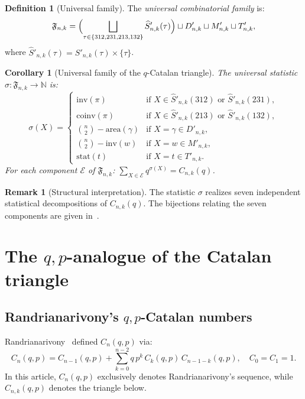 \documentclass[12pt,a4paper,reqno]{amsart}
\theoremstyle{plain}
\newtheorem{corollary}[theorem]{Corollary}
\theoremstyle{definition}
\newtheorem{definition}[theorem]{Definition}
\newtheorem{remark}[theorem]{Remark}
\newcommand{\Inv}{\mathrm{inv}}
\newcommand{\Coinv}{\mathrm{coinv}}
\newcommand{\Area}{\mathrm{area}}
\newcommand{\Snkp}[1]{S'_{n,k}(#1)}
\newcommand{\hSnkp}[1]{\widehat{S}'_{n,k}(#1)}
\newcommand{\Dnk}{D'_{n,k}}
\newcommand{\Mnk}{M'_{n,k}}
\newcommand{\NN}{\mathbb{N}}
\begin{document}
\begin{definition}[Universal family]\label{def:univ_family}
The \emph{universal combinatorial family} is:
\begin{equation}\label{eq:univ_family}
\mathfrak{F}_{n,k} = \Bigl(\bigsqcup_{\tau\in\{312,231,213,132\}}
\hSnkp{\tau}\Bigr)\sqcup\Dnk\sqcup\Mnk\sqcup T'_{n,k},
\end{equation}
where $\hSnkp{\tau}=\Snkp{\tau}\times\{\tau\}$.
\end{definition}

\begin{corollary}[Universal family of the $q$-Catalan triangle]\label{cor:equi}
The \emph{universal statistic} $\sigma:\mathfrak{F}_{n,k}\to\NN$ is:
\begin{equation}\label{eq:sigma}
\sigma(X)=\begin{cases}
\Inv(\pi) & \text{if }X\in\hSnkp{312}\text{ or }\hSnkp{231},\\
\Coinv(\pi) & \text{if }X\in\hSnkp{213}\text{ or }\hSnkp{132},\\
\binom{n}{2}-\Area(\gamma) & \text{if }X=\gamma\in\Dnk,\\
\binom{n}{2}-\Inv(w) & \text{if }X=w\in\Mnk,\\
\mathrm{stat}(t) & \text{if }X=t\in T'_{n,k}.
\end{cases}
\end{equation}
For each component $\mathcal{E}$ of $\mathfrak{F}_{n,k}$:
$\sum_{X\in\mathcal{E}}q^{\sigma(X)}=C_{n,k}(q)$.
\end{corollary}

\begin{remark}[Structural interpretation]\label{rem:struct}
The statistic $\sigma$ realizes seven independent statistical decompositions
of $C_{n,k}(q)$. The bijections relating the seven components
are given in~\cite{W3,W4}.
\end{remark}

\section{The $q{,}p$-analogue of the Catalan triangle}\label{sec:qp}
\subsection{Randrianarivony's $q{,}p$-Catalan numbers}
Randrianarivony~\cite{Rand} defined $C_n(q,p)$ via:
\begin{equation}\label{eq:rand}
C_n(q,p)=C_{n-1}(q,p)+\sum_{k=0}^{n-2}q\,p^k\,C_k(q,p)\,C_{n-1-k}(q,p),
\quad C_0=C_1=1.
\end{equation}
In this article, $C_n(q,p)$ exclusively denotes Randrianarivony's sequence,
while $C_{n,k}(q,p)$ denotes the triangle below.
\end{document}
